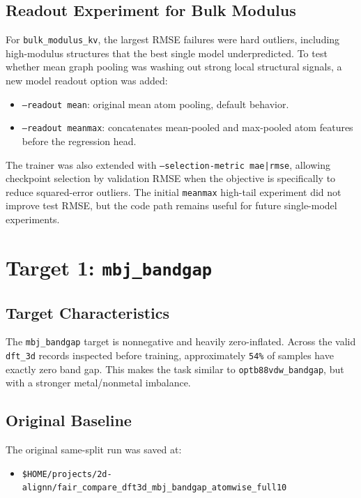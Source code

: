 \documentclass[11pt]{article}
\begin{document}
\subsection{Readout Experiment for Bulk Modulus}

For \texttt{bulk\_modulus\_kv}, the largest RMSE failures were hard outliers, including high-modulus structures that the best single model underpredicted.  To test whether mean graph pooling was washing out strong local structural signals, a new model readout option was added:
\begin{itemize}
  \item \texttt{--readout mean}: original mean atom pooling, default behavior.
  \item \texttt{--readout meanmax}: concatenates mean-pooled and max-pooled atom features before the regression head.
\end{itemize}

The trainer was also extended with \texttt{--selection-metric mae|rmse}, allowing checkpoint selection by validation RMSE when the objective is specifically to reduce squared-error outliers.  The initial \texttt{meanmax} high-tail experiment did not improve test RMSE, but the code path remains useful for future single-model experiments.

\section{Target 1: \texttt{mbj\_bandgap}}

\subsection{Target Characteristics}

The \texttt{mbj\_bandgap} target is nonnegative and heavily zero-inflated.  Across the valid \texttt{dft\_3d} records inspected before training, approximately \texttt{54\%} of samples have exactly zero band gap.  This makes the task similar to \texttt{optb88vdw\_bandgap}, but with a stronger metal/nonmetal imbalance.

\subsection{Original Baseline}

The original same-split run was saved at:
\begin{itemize}
  \item \texttt{\$HOME/projects/2d-alignn/fair\_compare\_dft3d\_mbj\_bandgap\_atomwise\_full10}
\end{itemize}
\end{document}
